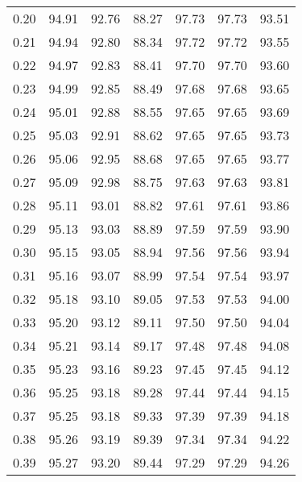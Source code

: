 \begin{tabular}{|c|c|c|c|c|c|c|}
      0.20 &     94.91 &     92.76 &      88.27 &   97.73 &      97.73 &         93.51 \\
      0.21 &     94.94 &     92.80 &      88.34 &   97.72 &      97.72 &         93.55 \\
      0.22 &     94.97 &     92.83 &      88.41 &   97.70 &      97.70 &         93.60 \\
      0.23 &     94.99 &     92.85 &      88.49 &   97.68 &      97.68 &         93.65 \\
      0.24 &     95.01 &     92.88 &      88.55 &   97.65 &      97.65 &         93.69 \\
      0.25 &     95.03 &     92.91 &      88.62 &   97.65 &      97.65 &         93.73 \\
      0.26 &     95.06 &     92.95 &      88.68 &   97.65 &      97.65 &         93.77 \\
      0.27 &     95.09 &     92.98 &      88.75 &   97.63 &      97.63 &         93.81 \\
      0.28 &     95.11 &     93.01 &      88.82 &   97.61 &      97.61 &         93.86 \\
      0.29 &     95.13 &     93.03 &      88.89 &   97.59 &      97.59 &         93.90 \\
      0.30 &     95.15 &     93.05 &      88.94 &   97.56 &      97.56 &         93.94 \\
      0.31 &     95.16 &     93.07 &      88.99 &   97.54 &      97.54 &         93.97 \\
      0.32 &     95.18 &     93.10 &      89.05 &   97.53 &      97.53 &         94.00 \\
      0.33 &     95.20 &     93.12 &      89.11 &   97.50 &      97.50 &         94.04 \\
      0.34 &     95.21 &     93.14 &      89.17 &   97.48 &      97.48 &         94.08 \\
      0.35 &     95.23 &     93.16 &      89.23 &   97.45 &      97.45 &         94.12 \\
      0.36 &     95.25 &     93.18 &      89.28 &   97.44 &      97.44 &         94.15 \\
      0.37 &     95.25 &     93.18 &      89.33 &   97.39 &      97.39 &         94.18 \\
      0.38 &     95.26 &     93.19 &      89.39 &   97.34 &      97.34 &         94.22 \\
      0.39 &     95.27 &     93.20 &      89.44 &   97.29 &      97.29 &         94.26 \\

\end{tabular}
